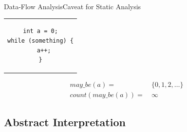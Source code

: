 \begin{frame}[fragile]{Data-Flow Analysis}{Caveat for Static Analysis}

  \begin{center}

  \medskip

  \begin{tabular}{c}
  \begin{lstlisting}
int a = 0;
while (something) {
  a++;
}
  \end{lstlisting}
  \end{tabular}

  \pause

  \begin{equation*}
    \begin{aligned}
      may\_be(a) = &\ \{ 0, 1, 2, \dots \} \\
      count(may\_be(a)) = &\ \infty
    \end{aligned}
  \end{equation*}
  \end{center}

\end{frame}

\subsection{Abstract Interpretation}
\frame{\subsectionpage}

